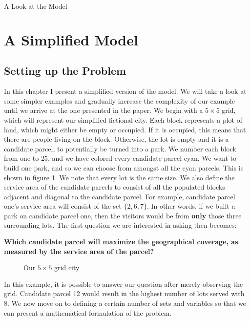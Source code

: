 \documentclass[12pt]{pom_thesis}
\begin{document}
\begin{chapter}{A Look at the Model}
\section{A Simplified Model}
\subsection{Setting up the Problem}

In this chapter I present a simplified version of the model. We will take a look at some simpler examples and gradually increase the complexity of our example until we arrive at the one presented in the paper. We begin with a $5\times5$ grid, which will represent our simplified fictional city. Each block represents a plot of land, which might either be empty or occupied. If it is occupied, this means that there are people living on the block. Otherwise, the lot is empty and it is a candidate parcel, to potentially be turned into a park. We number each block from one to $25$, and we have colored every candidate parcel cyan. We want to build one park, and so we can choose from amongst all the cyan parcels. This is shown in figure \ref{fig:grid1}. We note that every lot is the same size. We also define the service area of the candidate parcels to consist of all the populated blocks adjacent and diagonal to the candidate parcel. For example, candidate parcel one's service area will consist of the set $\{2,6,7\}$. In other words, if we built a park on candidate parcel one, then the visitors would be from \textbf{only} those three surrounding lots. The first question we are interested in asking then becomes: 
\begin{center}
\textbf{Which candidate parcel will maximize the geographical coverage, as measured by the service area of the parcel?}
\end{center}
\begin{figure}
 \caption{Our $5\times 5$ grid city}
 \centering
 \label{fig:grid1}
\end{figure}
In this example, it is possible to answer our question after merely observing the grid. Candidate parcel 12 would result in the highest number of lots served with 8. We now move on to defining a certain number of sets and variables so that we can present a mathematical formulation of the problem. \newline 
	

\end{chapter}
\end{document}
